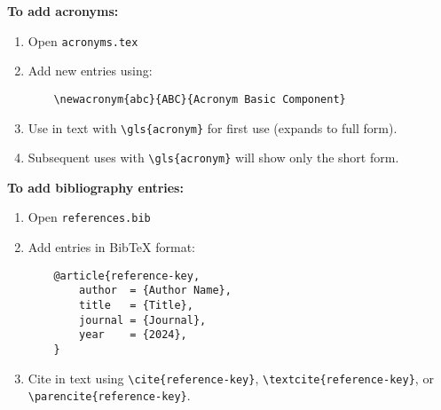 \textbf{To add acronyms:}
\begin{enumerate}
    \item Open \texttt{acronyms.tex}
    \item Add new entries using:
    \begin{verbatim}
    \newacronym{abc}{ABC}{Acronym Basic Component}
    \end{verbatim}
    \item Use in text with \verb|\gls{acronym}| for first use (expands to full form).
    \item Subsequent uses with \verb|\gls{acronym}| will show only the short form.
\end{enumerate}

\newpage

\textbf{To add bibliography entries:}
\begin{enumerate}
    \item Open \texttt{references.bib}
    \item Add entries in BibTeX format:
    \begin{verbatim}
    @article{reference-key,
        author  = {Author Name},
        title   = {Title},
        journal = {Journal},
        year    = {2024},
    }
    \end{verbatim}
    \item Cite in text using \verb|\cite{reference-key}|, \verb|\textcite{reference-key}|, or \verb|\parencite{reference-key}|.
\end{enumerate}

